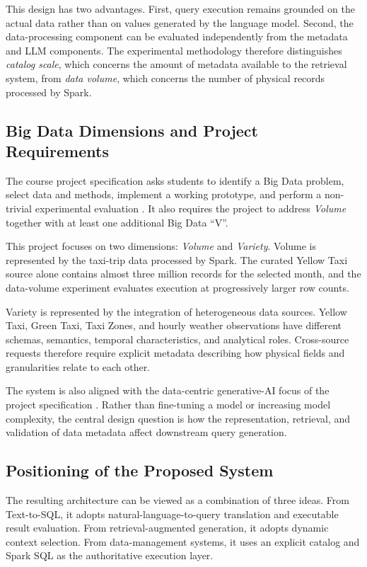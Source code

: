 This design has two advantages. First, query execution remains grounded
on the actual data rather than on values generated by the language
model. Second, the data-processing component can be evaluated
independently from the metadata and LLM components. The experimental
methodology therefore distinguishes \emph{catalog scale}, which concerns
the amount of metadata available to the retrieval system, from
\emph{data volume}, which concerns the number of physical records
processed by Spark.


\subsection{Big Data Dimensions and Project Requirements}

The course project specification asks students to identify a Big Data
problem, select data and methods, implement a working prototype, and
perform a non-trivial experimental evaluation
\cite{bigdataProject2026}. It also requires the project to address
\emph{Volume} together with at least one additional Big Data
``V''.

This project focuses on two dimensions: \emph{Volume} and
\emph{Variety}. Volume is represented by the taxi-trip data processed
by Spark. The curated Yellow Taxi source alone contains almost three
million records for the selected month, and the data-volume experiment
evaluates execution at progressively larger row counts.

Variety is represented by the integration of heterogeneous data
sources. Yellow Taxi, Green Taxi, Taxi Zones, and hourly weather
observations have different schemas, semantics, temporal
characteristics, and analytical roles. Cross-source requests therefore
require explicit metadata describing how physical fields and
granularities relate to each other.

The system is also aligned with the data-centric generative-AI focus of
the project specification \cite{bigdataProject2026}. Rather than
fine-tuning a model or increasing model complexity, the central design
question is how the representation, retrieval, and validation of data
metadata affect downstream query generation.


\subsection{Positioning of the Proposed System}

The resulting architecture can be viewed as a combination of three
ideas. From Text-to-SQL, it adopts natural-language-to-query
translation and executable result evaluation. From retrieval-augmented
generation, it adopts dynamic context selection. From data-management
systems, it uses an explicit catalog and Spark SQL as the authoritative
execution layer.

